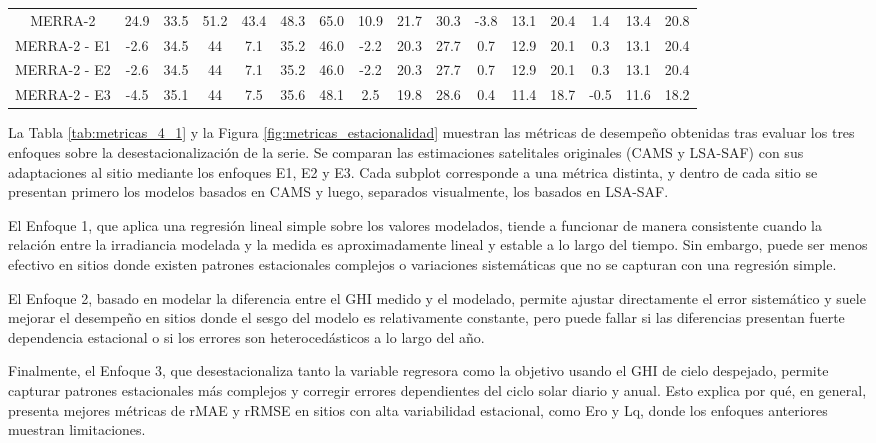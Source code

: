 \begin{table}
{\begin{tabular}{cccccccccccccccc}
\hline
MERRA-2      & 24.9 & 33.5 & 51.2 & 43.4 & 48.3 & 65.0 & 10.9 & 21.7 & 30.3 & -3.8  & 13.1 & 20.4 & 1.4  & 13.4 & 20.8 \\
MERRA-2 - E1 & -2.6 & 34.5 & 44   &  7.1 & 35.2 & 46.0 & -2.2 & 20.3 & 27.7 &  0.7 & 12.9  & 20.1 &  0.3 & 13.1 & 20.4 \\
MERRA-2 - E2 & -2.6 & 34.5 & 44   &  7.1 & 35.2 & 46.0 & -2.2 & 20.3 & 27.7 &  0.7 & 12.9  & 20.1 &  0.3 & 13.1 & 20.4 \\
MERRA-2 - E3 & -4.5 & 35.1 & 44   & 7.5  & 35.6 & 48.1 &  2.5 & 19.8 & 28.6 & 0.4  & 11.4  & 18.7 &-0.5  & 11.6 & 18.2 \\

\hline
\end{tabular}}
\end{table}


La Tabla \ref{tab:metricas_4_1} y la Figura \ref{fig:metricas_estacionalidad} muestran las métricas de desempeño obtenidas tras evaluar los tres enfoques sobre la desestacionalización de la serie. Se comparan las estimaciones satelitales originales (CAMS y LSA-SAF) con sus adaptaciones al sitio mediante los enfoques E1, E2 y E3. 
Cada subplot corresponde a una métrica distinta, y dentro de cada sitio se presentan primero los modelos basados en CAMS y luego, separados visualmente, los basados en LSA-SAF. 

El Enfoque 1, que aplica una regresión lineal simple sobre los valores modelados, tiende a funcionar de manera consistente cuando la relación entre la irradiancia modelada y la medida es aproximadamente lineal y estable a lo largo del tiempo. Sin embargo, puede ser menos efectivo en sitios donde existen patrones estacionales complejos o variaciones sistemáticas que no se capturan con una regresión simple. 

El Enfoque 2, basado en modelar la diferencia entre el GHI medido y el modelado, permite ajustar directamente el error sistemático y suele mejorar el desempeño en sitios donde el sesgo del modelo es relativamente constante, pero puede fallar si las diferencias presentan fuerte dependencia estacional o si los errores son heterocedásticos a lo largo del año.

Finalmente, el Enfoque 3, que desestacionaliza tanto la variable regresora como la objetivo usando el GHI de cielo despejado, permite capturar patrones estacionales más complejos y corregir errores dependientes del ciclo solar diario y anual. Esto explica por qué, en general, presenta mejores métricas de rMAE y rRMSE en sitios con alta variabilidad estacional, como Ero y Lq, donde los enfoques anteriores muestran limitaciones.\\





